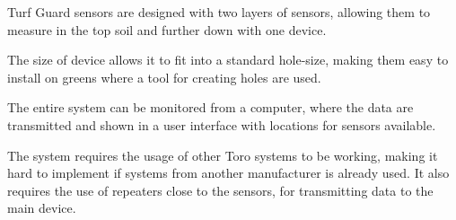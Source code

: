 Turf Guard\texttrademark{} sensors are designed with two layers of sensors, allowing them to measure in the top soil and further down with one device.

The size of device allows it to fit into a standard hole-size, making them easy to install on greens where a tool for creating holes are used\cite{turfGuard2}.

The entire system can be monitored from a computer, where the data are transmitted and shown in a user interface with locations for sensors available\cite{turfGuard2}.

The system requires the usage of other Toro systems to be working, making it hard to implement if systems from another manufacturer is already used. It also requires the use of repeaters close to the sensors, for transmitting data to the main device\cite{turfGuard2}.
